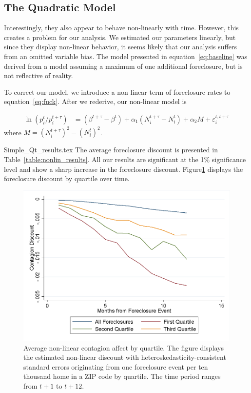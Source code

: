 \documentclass[12pt,oneside]{amsbook}
\newcommand{\bet}{\beta^t}
\newcommand{\dos}{{t + \tau}}
\newcommand{\teps}{\varepsilon^{t,\dos}_i}
\begin{document}
\subsection{The Quadratic Model}
Interestingly, they also appear to behave non-linearly with time. However, this creates a problem for our analysis. We estimated our parameters linearly, but since they display non-linear behavior, it seems likely that our analysis suffers from an omitted variable bias. The model presented in equation~\ref{eq:baseline} was derived from a model assuming a maximum of one additional foreclosure, but is not reflective of reality. 

To correct our model, we introduce a non-linear term of foreclosure rates to  equation~\ref{eq:fuck}. After we rederive, our non-linear model is 

\begin{align}
\ln (p^t_{i} / p^\dos_i) & = (\beta^\dos - \bet) + \alpha_1 ( N_i^\dos - N_i^t ) + \alpha_2 M + \teps \label{eq:nonlin}
\end{align} 
where $M =  (N_i^\dos)^2 - (N_i^t )^2$. 

{Simple_Qt_results.tex}
 The average foreclosure discount is presented in Table~\ref{table:nonlin_results}. All our results are significant at the 1\% significance level and show a sharp increase in the foreclosure discount. Figure\ref{fig:nonlin} displays the foreclosure discount by quartile over time. 

\begin{figure}\label{fig:nonlin} 
\centering
\includegraphics[width=\textwidth]{20MSA_nonlinquart.png}
\caption{\tiny Average non-linear contagion affect by quartile. The figure displays the estimated non-linear discount with heteroskedasticity-consistent standard errors originating from one foreclosure event per ten thousand home in a ZIP code by quartile. The time period ranges from $t+1$ to $t+12$. }
\end{figure}
\end{document}
